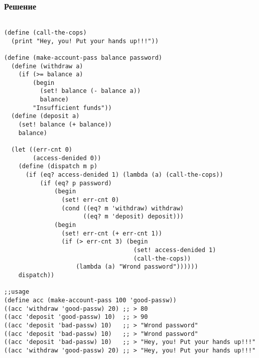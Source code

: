 \documentclass[10pt,a4paper]{article}
\begin{document}
\subsubsection*{Решение}
\begin{lstlisting}

(define (call-the-cops)
  (print "Hey, you! Put your hands up!!!"))

(define (make-account-pass balance password)
  (define (withdraw a)
    (if (>= balance a)
        (begin
          (set! balance (- balance a))
          balance)
        "Insufficient funds"))
  (define (deposit a)
    (set! balance (+ balance))
    balance)
  
  (let ((err-cnt 0)
        (access-denided 0))
    (define (dispatch m p)
      (if (eq? access-denided 1) (lambda (a) (call-the-cops))
          (if (eq? p password)
              (begin
                (set! err-cnt 0)
                (cond ((eq? m 'withdraw) withdraw)
                      ((eq? m 'deposit) deposit)))
              (begin
                (set! err-cnt (+ err-cnt 1))
                (if (> err-cnt 3) (begin
                                    (set! access-denided 1)
                                    (call-the-cops))
                    (lambda (a) "Wrond password"))))))
    dispatch))

;;usage
(define acc (make-account-pass 100 'good-passw))
((acc 'withdraw 'good-passw) 20) ;; > 80
((acc 'deposit 'good-passw) 10)  ;; > 90
((acc 'deposit 'bad-passw) 10)   ;; > "Wrond password"
((acc 'deposit 'bad-passw) 10)   ;; > "Wrond password"
((acc 'deposit 'bad-passw) 10)   ;; > "Hey, you! Put your hands up!!!"
((acc 'withdraw 'good-passw) 20) ;; > "Hey, you! Put your hands up!!!"

\end{lstlisting}
\end{document}
